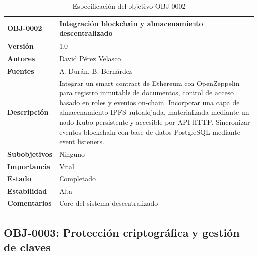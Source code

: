 \documentclass[11pt, a4paper]{article}
\begin{document}
\begin{table}[H]
    \centering
    \small
    \begin{tabular}{|p{4cm}|p{10cm}|}
    \hline
    \textbf{OBJ-0002} & Integración blockchain y almacenamiento descentralizado \\
    \hline
    \textbf{Versión} & 1.0 \\
    \hline
    \textbf{Autores} & David Pérez Velasco \\
    \hline
    \textbf{Fuentes} & A. Durán, B. Bernárdez \\
    \hline
    \textbf{Descripción} & Integrar un smart contract de Ethereum con OpenZeppelin para registro inmutable de documentos, control de acceso basado en roles y eventos on-chain. Incorporar una capa de almacenamiento IPFS autoalojada, materializada mediante un nodo Kubo persistente y accesible por API HTTP. Sincronizar eventos blockchain con base de datos PostgreSQL mediante event listeners. \\
    \hline
    \textbf{Subobjetivos} & Ninguno \\
    \hline
    \textbf{Importancia} & Vital \\
    \hline
    \textbf{Estado} & Completado \\
    \hline
    \textbf{Estabilidad} & Alta \\
    \hline
    \textbf{Comentarios} & Core del sistema descentralizado \\
    \hline
    \end{tabular}
    \caption{Especificación del objetivo OBJ-0002}
\end{table}

\subsection{OBJ-0003: Protección criptográfica y gestión de claves}
\end{document}
